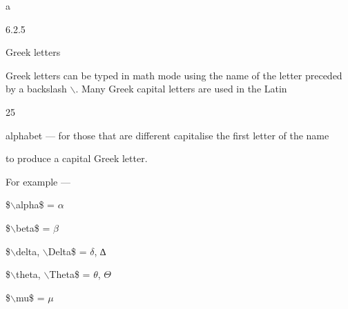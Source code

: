 \documentclass[a4paper,portrait,12pt]{article}
\begin{document}
\begin{flushleft}
a
\end{flushleft}





6.2.5





\begin{flushleft}
Greek letters
\end{flushleft}





\begin{flushleft}
Greek letters can be typed in math mode using the name of the letter preceded by a backslash \ensuremath{\backslash}. Many Greek capital letters are used in the Latin
\end{flushleft}


25





\begin{flushleft}
\newpage
alphabet --- for those that are different capitalise the first letter of the name
\end{flushleft}


\begin{flushleft}
to produce a capital Greek letter.
\end{flushleft}


\begin{flushleft}
For example ---
\end{flushleft}


\begin{flushleft}
\$\ensuremath{\backslash}alpha\$ = $\alpha$
\end{flushleft}


\begin{flushleft}
\$\ensuremath{\backslash}beta\$ = $\beta$
\end{flushleft}


\begin{flushleft}
\$\ensuremath{\backslash}delta, \ensuremath{\backslash}Delta\$ = $\delta$, ∆
\end{flushleft}


\begin{flushleft}
\$\ensuremath{\backslash}theta, \ensuremath{\backslash}Theta\$ = $\theta$, $\Theta$
\end{flushleft}


\begin{flushleft}
\$\ensuremath{\backslash}mu\$ = $\mu$
\end{flushleft}
\end{document}
